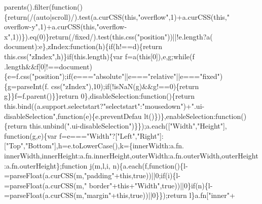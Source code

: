 \begin{DoxyCode}
      parents().filter(\textcolor{keyword}{function}()\{\textcolor{keywordflow}{return}(/(\textcolor{keyword}{auto}|scroll)/).test(a.curCSS(\textcolor{keyword}{this},\textcolor{stringliteral}{"overflow"},1)+a.curCSS(\textcolor{keyword}{this},\textcolor{stringliteral}{"
      overflow-y"},1)+a.curCSS(\textcolor{keyword}{this},\textcolor{stringliteral}{"overflow-x"},1))\}).eq(0)\}\textcolor{keywordflow}{return}(/fixed/).test(this.css(\textcolor{stringliteral}{"position"}))||!e.length?a(
      document):e\},zIndex:function(h)\{\textcolor{keywordflow}{if}(h!==d)\{\textcolor{keywordflow}{return} this.css(\textcolor{stringliteral}{"zIndex"},h)\}\textcolor{keywordflow}{if}(this.length)\{var f=a(\textcolor{keyword}{this}[0]),e,g;\textcolor{keywordflow}{while}(f
      .length&&f[0]!==document)\{e=f.css(\textcolor{stringliteral}{"position"});\textcolor{keywordflow}{if}(e===\textcolor{stringliteral}{"absolute"}||e===\textcolor{stringliteral}{"relative"}||e===\textcolor{stringliteral}{"fixed"})\{g=parseInt(f.
      css(\textcolor{stringliteral}{"zIndex"}),10);\textcolor{keywordflow}{if}(!isNaN(g)&&g!==0)\{\textcolor{keywordflow}{return} g\}\}f=f.parent()\}\}\textcolor{keywordflow}{return} 0\},disableSelection:\textcolor{keyword}{function}()\{\textcolor{keywordflow}{return} 
      this.bind((a.support.selectstart?\textcolor{stringliteral}{"selectstart"}:\textcolor{stringliteral}{"mousedown"})+\textcolor{stringliteral}{".ui-disableSelection"},\textcolor{keyword}{function}(e)\{e.preventDefau
      lt()\})\},enableSelection:\textcolor{keyword}{function}()\{\textcolor{keywordflow}{return} this.unbind(\textcolor{stringliteral}{".ui-disableSelection"})\}\});a.each([\textcolor{stringliteral}{"Width"},\textcolor{stringliteral}{"Height"}],\textcolor{keyword}{
      function}(g,e)\{var f=e===\textcolor{stringliteral}{"Width"}?[\textcolor{stringliteral}{"Left"},\textcolor{stringliteral}{"Right"}]:[\textcolor{stringliteral}{"Top"},\textcolor{stringliteral}{"Bottom"}],h=e.toLowerCase(),k=\{innerWidth:a.fn.
      innerWidth,innerHeight:a.fn.innerHeight,outerWidth:a.fn.outerWidth,outerHeight:a.fn.outerHeight\};\textcolor{keyword}{function} j(m,l,i,
      n)\{a.each(f,\textcolor{keyword}{function}()\{l-=parseFloat(a.curCSS(m,\textcolor{stringliteral}{"padding"}+\textcolor{keyword}{this},\textcolor{keyword}{true}))||0;\textcolor{keywordflow}{if}(i)\{l-=parseFloat(a.curCSS(m,\textcolor{stringliteral}{"
      border"}+\textcolor{keyword}{this}+\textcolor{stringliteral}{"Width"},\textcolor{keyword}{true}))||0\}\textcolor{keywordflow}{if}(n)\{l-=parseFloat(a.curCSS(m,\textcolor{stringliteral}{"margin"}+\textcolor{keyword}{this},\textcolor{keyword}{true}))||0\}\});\textcolor{keywordflow}{return} l\}a.fn[\textcolor{stringliteral}{"inner"}+

\end{DoxyCode}
